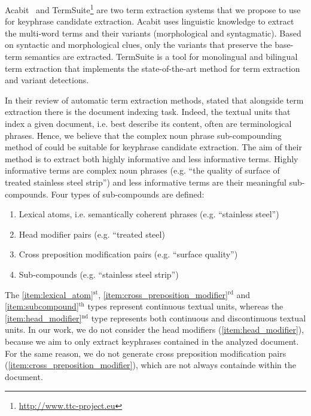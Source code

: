   Acabit~\cite{daille2003acabit} and
  TermSuite\footnote{\url{http://www.ttc-project.eu}} are two term extraction
  systems that we propose to use for keyphrase candidate extraction. Acabit uses
  linguistic knowledge to extract the multi-word terms and their variants
  (morphological and syntagmatic). Based on syntactic and morphological clues,
  only the variants that preserve the base-term semantics are extracted.
  TermSuite is a tool for monolingual and bilingual term extraction that
  implements the state-of-the-art method for term extraction and variant
  detections.

  In their review of automatic term extraction methods,
   stated that alongside term
  extraction there is the document indexing task. Indeed, the textual units that
  index a given document, i.e. best describe its content, often are
  terminological phrases. Hence, we believe that the complex noun phrase
  sub-compounding method of  could be
  suitable for keyphrase candidate extraction. The aim of their method is to
  extract both highly informative and less informative terms. Highly informative
  terms are complex noun phrases (e.g. ``the quality of surface of treated
  stainless steel strip'') and less  informative terms are their meaningful
  sub-compounds. Four types of sub-compounds are defined:
  \begin{enumerate}
    \item{Lexical atoms, i.e. semantically coherent phrases (e.g. ``stainless
          steel'')
          \label{item:lexical_atom}}
    \item{Head modifier pairs (e.g. ``treated steel)
          \label{item:head_modifier}}
    \item{Cross preposition modification pairs (e.g. ``surface quality'')
          \label{item:cross_preposition_modifier}}
    \item{Sub-compounds (e.g. ``stainless steel strip'')
          \label{item:subcompound}}
  \end{enumerate}
  The \ref{item:lexical_atom}$^\text{st}$,
  \ref{item:cross_preposition_modifier}$^\text{rd}$ and
  \ref{item:subcompound}$^\text{th}$ types represent continuous textual units,
  whereas the \ref{item:head_modifier}$^\text{nd}$ type represents both
  continuous and discontinuous textual units. In our work, we do not consider
  the head modifiers (\ref{item:head_modifier}), because we aim to only extract
  keyphrases contained in the analyzed document. For the same reason, we do not
  generate cross preposition modification pairs
  (\ref{item:cross_preposition_modifier}), which are not always containde within
  the document.

